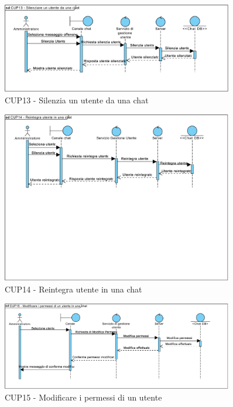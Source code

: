 \begin{figure}
	\centering
	\includegraphics[width=0.9\textwidth]{imgs/gruppo6/sequence/CUP13_silenzia_un_utente_da_una_chat.pdf}
	\caption{CUP13 - Silenzia un utente da una chat}
	\label{fig:seq-cup13}
\end{figure}

\begin{figure}
	\centering
	\includegraphics[width=0.9\textwidth]{imgs/gruppo6/sequence/CUP14_reintegra_utente_in_una_chat.pdf}
	\caption{CUP14 - Reintegra utente in una chat}
	\label{fig:seq-cup14}
\end{figure}

\begin{figure}
	\centering
	\includegraphics[width=0.9\textwidth]{imgs/gruppo6/sequence/CUP15_modificare_i_permessi_di_un_utente.pdf}
	\caption{CUP15 - Modificare i permessi di un utente}
	\label{fig:seq-cup15}
\end{figure}

